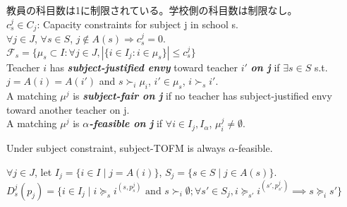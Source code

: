 \documentclass[a4j,10pt]{jsarticle}
\theoremstyle{definition}
\theoremstyle{remark}
\theoremstyle{plain}
\begin{document}
教員の科目数は1に制限されている。学校側の科目数は制限なし。\\
$c^j_s \in C_j$: Capacity constraints for subject j in school s.\\
$\forall j \in J$, $\forall s \in S$, $j \notin A(s) \Rightarrow c^j_s =0$.\\
$\mathcal{F}_s =\{\mu_s \subset I: \forall j \in J, |\{i \in I_j : i \in \mu_s\}| \leq c^j_s\}$\\
Teacher $i$ has {\bf \emph{subject-justified envy}} toward teacher $i'$ {\bf \emph{on j}} if $\exists s \in S $ s.t. $j = A(i) = A(i')$ and $s \succ_i \mu_i$, $i' \in \mu_s$, $i \succ_s i'$.\\
A matching $\mu^j$ is {\bf \emph{subject-fair on j}} if no teacher has subject-justified envy toward another teacher on j.\\
A matching $\mu^j$ is {\bf \emph{$\alpha$-feasible on j}} if $\forall i \in I_j, I_\alpha$, $\mu^j_i \neq \emptyset$.\\

\begin{tcolorbox}
  Under subject constraint, subject-TOFM is always $\alpha$-feasible.
\end{tcolorbox}
$\forall j \in J$, let $I_j = \{i \in I \mid j = A(i)\}$, $S_j = \{s \in S \mid j \in A(s)\}$.\\
$D^j_s(p_j) = \{ i \in I_j \mid i \succeq_s i^{(s,p^j_s)} \text{ and } s \succ_i \emptyset; \forall s' \in S_j, i \succeq_{s'} i^{(s',p^j_{s'})} \implies s \succeq_i s' \}$\\
\end{document}
